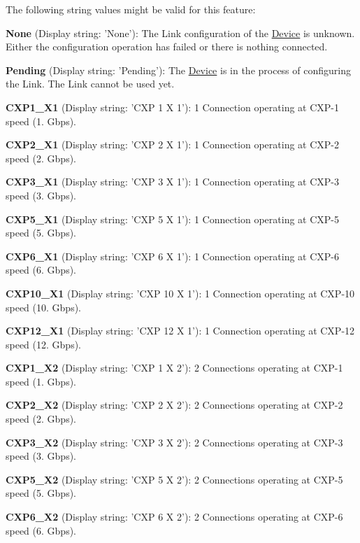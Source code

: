 The following string values might be valid for this feature\+:
\begin{DoxyItemize}
\item {\bfseries None} (Display string\+: 'None')\+: The Link configuration of the \hyperlink{classmv_i_m_p_a_c_t_1_1acquire_1_1_device}{Device} is unknown. Either the configuration operation has failed or there is nothing connected.
\item {\bfseries Pending} (Display string\+: 'Pending')\+: The \hyperlink{classmv_i_m_p_a_c_t_1_1acquire_1_1_device}{Device} is in the process of configuring the Link. The Link cannot be used yet.
\item {\bfseries C\+X\+P1\+\_\+\+X1} (Display string\+: 'C\+X\+P 1 X 1')\+: 1 Connection operating at C\+X\+P-\/1 speed (1. Gbps).
\item {\bfseries C\+X\+P2\+\_\+\+X1} (Display string\+: 'C\+X\+P 2 X 1')\+: 1 Connection operating at C\+X\+P-\/2 speed (2. Gbps).
\item {\bfseries C\+X\+P3\+\_\+\+X1} (Display string\+: 'C\+X\+P 3 X 1')\+: 1 Connection operating at C\+X\+P-\/3 speed (3. Gbps).
\item {\bfseries C\+X\+P5\+\_\+\+X1} (Display string\+: 'C\+X\+P 5 X 1')\+: 1 Connection operating at C\+X\+P-\/5 speed (5. Gbps).
\item {\bfseries C\+X\+P6\+\_\+\+X1} (Display string\+: 'C\+X\+P 6 X 1')\+: 1 Connection operating at C\+X\+P-\/6 speed (6. Gbps).
\item {\bfseries C\+X\+P10\+\_\+\+X1} (Display string\+: 'C\+X\+P 10 X 1')\+: 1 Connection operating at C\+X\+P-\/10 speed (10. Gbps).
\item {\bfseries C\+X\+P12\+\_\+\+X1} (Display string\+: 'C\+X\+P 12 X 1')\+: 1 Connection operating at C\+X\+P-\/12 speed (12. Gbps).
\item {\bfseries C\+X\+P1\+\_\+\+X2} (Display string\+: 'C\+X\+P 1 X 2')\+: 2 Connections operating at C\+X\+P-\/1 speed (1. Gbps).
\item {\bfseries C\+X\+P2\+\_\+\+X2} (Display string\+: 'C\+X\+P 2 X 2')\+: 2 Connections operating at C\+X\+P-\/2 speed (2. Gbps).
\item {\bfseries C\+X\+P3\+\_\+\+X2} (Display string\+: 'C\+X\+P 3 X 2')\+: 2 Connections operating at C\+X\+P-\/3 speed (3. Gbps).
\item {\bfseries C\+X\+P5\+\_\+\+X2} (Display string\+: 'C\+X\+P 5 X 2')\+: 2 Connections operating at C\+X\+P-\/5 speed (5. Gbps).
\item {\bfseries C\+X\+P6\+\_\+\+X2} (Display string\+: 'C\+X\+P 6 X 2')\+: 2 Connections operating at C\+X\+P-\/6 speed (6. Gbps).

\end{DoxyItemize}
